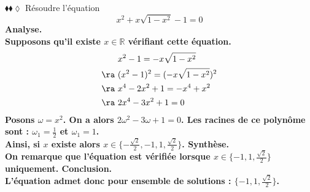 \documentclass[11pt]{article}
\begin{document}
\pagebreak

\begin{exercice}{$\blacklozenge\blacklozenge\lozenge$}{}
    Résoudre l'équation
    \begin{equation*}
        x^2 + x\sqrt{1-x^2}-1=0
    \end{equation*}
    \tcblower
    \bf{Analyse.}\\
    Supposons qu'il existe $x\in\mathbb{R}$ vérifiant cette équation.
    \begin{align*}
        &x^2-1=-x\sqrt{1-x^2}\\
        \ra~& (x^2-1)^2=(-x\sqrt{1-x^2})^2\\
        \ra~& x^4 - 2x^2 + 1 = -x^4+x^2\\
        \ra~& 2x^4-3x^2+1=0
    \end{align*}
    Posons $\omega=x^2$. On a alors $2\omega^2-3\omega+1=0$. Les racines de ce polynôme sont : $\omega_1=\frac{1}{2}$ et $\omega_1=1$.\\
    Ainsi, si $x$ existe alors $x\in\{-\frac{\sqrt{2}}{2},-1,1,\frac{\sqrt{2}}{2}\}$.\n
    \bf{Synthèse.}\\
    On remarque que l'équation est vérifiée lorsque $x\in\{-1,1,\frac{\sqrt{2}}{2}\}$ uniquement.\n
    \bf{Conclusion.}\\
    L'équation admet donc pour ensemble de solutions : $\{-1,1,\frac{\sqrt{2}}{2}\}$.
\end{exercice}
\end{document}
